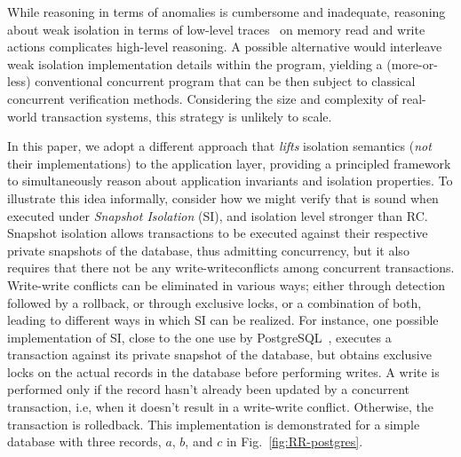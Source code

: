 While reasoning in terms of anomalies is cumbersome and inadequate,
reasoning about weak isolation in terms of low-level
traces~\cite{adyaphd,gotsmanconcur15} on memory read and write actions
complicates high-level reasoning.  A possible alternative would
interleave weak isolation implementation details within the program,
yielding a (more-or-less) conventional concurrent program that can be
then subject to classical concurrent verification methods.
Considering the size and complexity of real-world transaction systems,
this strategy is unlikely to scale.

In this paper, we adopt a different approach that \emph{lifts}
isolation semantics (\emph{not} their implementations) to the
application layer, providing a principled framework to simultaneously
reason about application invariants and isolation properties.  To
illustrate this idea informally, consider how we might verify that
 is sound when executed under \emph{Snapshot Isolation}
(SI), and isolation level stronger than RC. Snapshot isolation
allows transactions to be executed against their respective private
snapshots of the database, thus admitting concurrency, but it also
requires that there not be any write-writeconflicts among
concurrent transactions. Write-write conflicts can be eliminated in various
ways; either through detection followed by a rollback, or through
exclusive locks, or a combination of both, leading to different ways
in which SI can be realized. For instance, one possible implementation
of SI, close to the one use by PostgreSQL~\cite{postgres-ssi},
executes a transaction against its private snapshot of the database,
but obtains exclusive locks on the actual records in the database
before performing writes. A write is performed only if the record
hasn't already been updated by a concurrent transaction, i.e,  when it
doesn't result in a write-write conflict.  Otherwise, the transaction is
rolledback. This implementation is demonstrated for a simple database
with three records, $a$, $b$, and $c$ in Fig.~\ref{fig:RR-postgres}.

